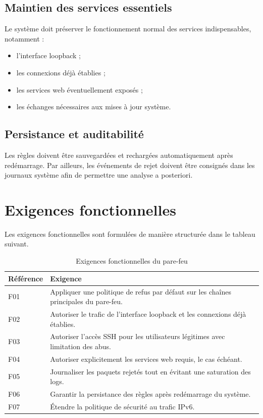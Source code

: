 \subsection{Maintien des services essentiels}

Le système doit préserver le fonctionnement normal des services indispensables, notamment :
\begin{itemize}
    \item l'interface loopback ;
    \item les connexions déjà établies ;
    \item les services web éventuellement exposés ;
    \item les échanges nécessaires aux mises à jour système.
\end{itemize}

\subsection{Persistance et auditabilité}

Les règles doivent être sauvegardées et rechargées automatiquement après redémarrage. Par ailleurs, les événements de rejet doivent être consignés dans les journaux système afin de permettre une analyse a posteriori.

\section{Exigences fonctionnelles}

Les exigences fonctionnelles sont formulées de manière structurée dans le tableau suivant.

\begin{table}[H]
\centering
\caption{Exigences fonctionnelles du pare-feu}
\begin{tabularx}{\textwidth}{|>{\raggedright\arraybackslash}p{2.4cm}|X|}
\hline
\rowcolor{gray!20}
\textbf{Référence} & \textbf{Exigence} \\
\hline
F01 & Appliquer une politique de refus par défaut sur les chaînes principales du pare-feu. \\
\hline
F02 & Autoriser le trafic de l'interface loopback et les connexions déjà établies. \\
\hline
F03 & Autoriser l'accès SSH pour les utilisateurs légitimes avec limitation des abus. \\
\hline
F04 & Autoriser explicitement les services web requis, le cas échéant. \\
\hline
F05 & Journaliser les paquets rejetés tout en évitant une saturation des logs. \\
\hline
F06 & Garantir la persistance des règles après redémarrage du système. \\
\hline
F07 & Étendre la politique de sécurité au trafic IPv6. \\
\hline
\end{tabularx}
\end{table}

